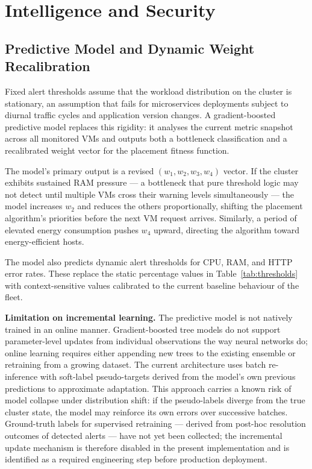 \documentclass[12pt,a4paper]{report}
\begin{document}
\section{Intelligence and Security}

\subsection{Predictive Model and Dynamic Weight Recalibration}
\label{sec:prediction}

Fixed alert thresholds assume that the workload distribution on the cluster is
stationary, an assumption that fails for microservices deployments subject to
diurnal traffic cycles and application version changes. A gradient-boosted predictive
model replaces this rigidity: it analyses the current metric snapshot across all
monitored VMs and outputs both a bottleneck classification and a recalibrated weight
vector for the placement fitness function.

The model's primary output is a revised $(w_1, w_2, w_3, w_4)$ vector. If the
cluster exhibits sustained RAM pressure --- a bottleneck that pure threshold logic
may not detect until multiple VMs cross their warning levels simultaneously ---
the model increases $w_2$ and reduces the others proportionally, shifting the
placement algorithm's priorities before the next VM request arrives. Similarly,
a period of elevated energy consumption pushes $w_4$ upward, directing the algorithm
toward energy-efficient hosts.

The model also predicts dynamic alert thresholds for CPU, RAM, and HTTP error rates.
These replace the static percentage values in Table~\ref{tab:thresholds} with
context-sensitive values calibrated to the current baseline behaviour of the fleet.

\textbf{Limitation on incremental learning.} The predictive model is not natively
trained in an online manner. Gradient-boosted tree models do not support parameter-level
updates from individual observations the way neural networks do; online learning
requires either appending new trees to the existing ensemble or retraining from a
growing dataset. The current architecture uses batch re-inference with
soft-label pseudo-targets derived from the model's own previous predictions to
approximate adaptation. This approach carries a known risk of model collapse under
distribution shift: if the pseudo-labels diverge from the true cluster state, the
model may reinforce its own errors over successive batches. Ground-truth labels for
supervised retraining --- derived from post-hoc resolution outcomes of detected
alerts --- have not yet been collected; the incremental update mechanism is therefore
disabled in the present implementation and is identified as a required engineering
step before production deployment.
\end{document}
